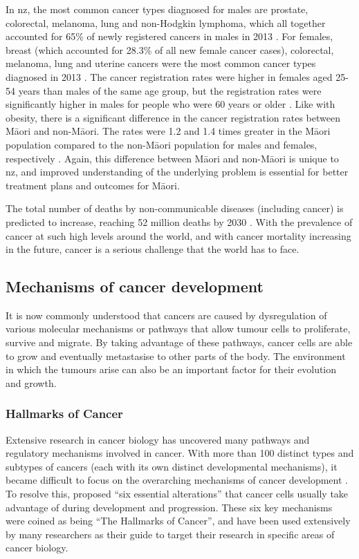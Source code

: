 In \gls{nz}, the most common cancer types diagnosed for males are prostate, colorectal, melanoma, lung and non-Hodgkin lymphoma, which all together accounted for 65\% of newly registered cancers in males in 2013 \citep{Health2016b}.
For females, breast (which accounted for 28.3\% of all new female cancer cases), colorectal, melanoma, lung and uterine cancers were the most common cancer types diagnosed in 2013 \citep{Health2016b}.
The cancer registration rates were higher in females aged 25-54 years than males of the same age group, but the registration rates were significantly higher in males for people who were 60 years or older \citep{Health2016b}.
Like with obesity, there is a significant difference in the cancer registration rates between M\=aori and non-M\=aori.
The rates were 1.2 and 1.4 times greater in the M\=aori population compared to the non-M\=aori population for males and females, respectively \citep{Health2016b}.
Again, this difference between M\=aori and non-M\=aori is unique to \gls{nz}, and improved understanding of the underlying problem is essential for better treatment plans and outcomes for M\=aori.

The total number of deaths by non-communicable diseases (including cancer) is predicted to increase, reaching 52 million deaths by 2030 \citep{WHO2014}.
With the prevalence of cancer at such high levels around the world, and with cancer mortality increasing in the future, cancer is a serious challenge that the world has to face.

\subsection{Mechanisms of cancer development}
\label{sub:mechanisms_of_cancer_development}

It is now commonly understood that cancers are caused by dysregulation of various molecular mechanisms or pathways that allow tumour cells to proliferate, survive and migrate.
By taking advantage of these pathways, cancer cells are able to grow and eventually metastasise to other parts of the body.
The environment in which the tumours arise can also be an important factor for their evolution and growth.

\subsubsection{Hallmarks of Cancer}
\label{subsubsec:cancerhallmarks}

Extensive research in cancer biology has uncovered many pathways and regulatory mechanisms involved in cancer.
With more than 100 distinct types and subtypes of cancers (each with its own distinct developmental mechanisms), it became difficult to focus on the overarching mechanisms of cancer development \citep{Hanahan2000}.
To resolve this, \citet{Hanahan2000} proposed ``six essential alterations'' that cancer cells usually take advantage of during development and progression.
These six key mechanisms were coined as being ``The Hallmarks of Cancer'', and have been used extensively by many researchers as their guide to target their research in specific areas of cancer biology.

